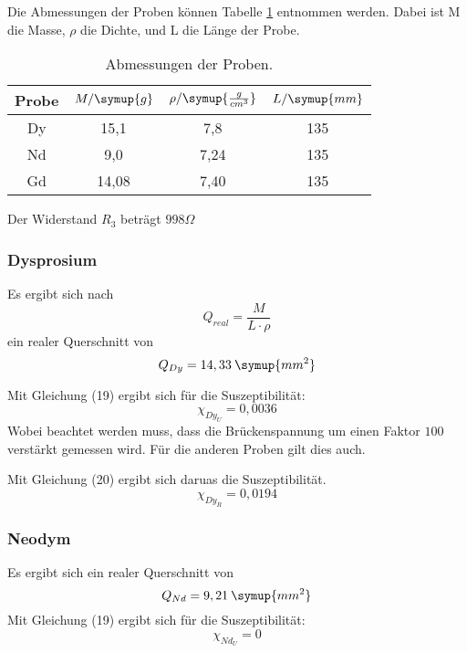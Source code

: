Die Abmessungen der Proben können Tabelle \ref{tab:Dy} entnommen werden.
Dabei ist M die Masse, $\rho$ die Dichte, und L die Länge der Probe.

\begin{table}[H]
  \centering
  \caption{Abmessungen der Proben.}
  \label{tab:Dy}
  \begin{tabular}{c c c c}
    \toprule
    Probe & $M/ \symup{g}$ & $\rho / \symup{\frac{g}{cm^3}}$   & $L / \symup{mm}$  \\
    \midrule
    Dy & 15,1 & 7,8 & 135\\
    Nd & 9,0 & 7,24 & 135\\
    Gd & 14,08 & 7,40 & 135\\
    \bottomrule
  \end{tabular}
\end{table}


Der Widerstand $R_3$ beträgt $998 \Omega$

\subsubsection{Dysprosium}
Es ergibt sich nach
\begin{equation*}
  Q_{real} = \frac{M}{L \cdot \rho}
\end{equation*}
ein realer Querschnitt von
\begin{equation*}
  Q_{Dy} = 14,33 \: \symup{mm^2}
\end{equation*}

Mit Gleichung (19) ergibt sich für die Suszeptibilität:
\begin{equation*}
  \chi_{Dy_U} = 0,0036 %
\end{equation*}
Wobei beachtet werden muss, dass die Brückenspannung um einen Faktor $100$ verstärkt gemessen wird. Für die anderen
Proben gilt dies auch.

Mit Gleichung (20) ergibt sich daruas die Suszeptibilität.
\begin{equation*}
  \chi_{Dy_R} = 0,0194  %
\end{equation*}

\subsubsection{Neodym}
Es ergibt sich ein realer Querschnitt von
\begin{equation*}
  Q_{Nd} = 9,21 \: \symup{mm^2} %
\end{equation*}
Mit Gleichung (19) ergibt sich für die Suszeptibilität:
\begin{equation*}
  \chi_{Nd_U} = 0 %
\end{equation*}

